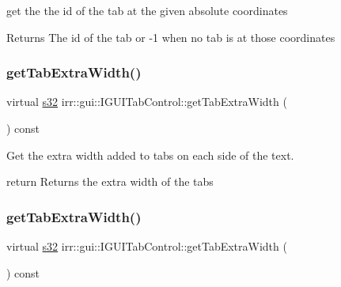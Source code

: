 get the the id of the tab at the given absolute coordinates 

\begin{DoxyReturn}{Returns}
The id of the tab or -\/1 when no tab is at those coordinates 
\end{DoxyReturn}
\mbox{\label{classirr_1_1gui_1_1IGUITabControl_afaeab7a998a34ab5e8398930276ab3bd}} 
\subsubsection{\texorpdfstring{get\+Tab\+Extra\+Width()}{getTabExtraWidth()}\hspace{0.1cm}{\footnotesize\ttfamily [1/2]}}
{\footnotesize\ttfamily virtual \hyperlink{namespaceirr_ac66849b7a6ed16e30ebede579f9b47c6}{s32} irr\+::gui\+::\+I\+G\+U\+I\+Tab\+Control\+::get\+Tab\+Extra\+Width (\begin{DoxyParamCaption}{ }\end{DoxyParamCaption}) const\hspace{0.3cm}{\ttfamily [pure virtual]}}



Get the extra width added to tabs on each side of the text. 

return Returns the extra width of the tabs \mbox{\label{classirr_1_1gui_1_1IGUITabControl_afaeab7a998a34ab5e8398930276ab3bd}} 
\subsubsection{\texorpdfstring{get\+Tab\+Extra\+Width()}{getTabExtraWidth()}\hspace{0.1cm}{\footnotesize\ttfamily [2/2]}}
{\footnotesize\ttfamily virtual \hyperlink{namespaceirr_ac66849b7a6ed16e30ebede579f9b47c6}{s32} irr\+::gui\+::\+I\+G\+U\+I\+Tab\+Control\+::get\+Tab\+Extra\+Width (\begin{DoxyParamCaption}{ }\end{DoxyParamCaption}) const\hspace{0.3cm}{\ttfamily [pure virtual]}}



